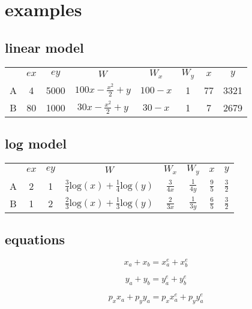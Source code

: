 \documentclass[12pt,a4paper]{article}
\author{surecalois}
\begin{document}
\section{examples}
\subsection{linear model}
\begin{center}
\begin{tabular}{cccccccc}
  & $ex$ & $ey$ & $W$ & $W_x$     & $W_y$ & $x$ & $y$ \\[10pt]
 A & 4 & 5000  & \( 100x-\frac{x^2}{2} + y \) & $ 100-x $ & 1 & 77 & 3321 \\[10pt]
 B & 80 & 1000  & \( 30x-\frac{x^2}{2} + y \) & $ 30-x $ & 1 & 7 & 2679 \\[10pt]
\end{tabular}
\end{center}
\subsection{log model}
\begin{center}
\begin{tabular}{cccccccc}
  & $ex$ & $ey$ & $W$ & $W_x$     & $W_y$ & $x$ & $y$ \\[10pt]
 A & 2 & 1  & \( \frac{3}{4}\mathrm{log}(x)+\frac{1}{4}\mathrm{log}(y) \) & $ \frac{3}{4x} $ & $\frac{1}{4y} $ & $ \frac{9}{5} $ & $ \frac{3}{2} $ \\[10pt]
 B & 1 & 2  & \( \frac{2}{3}\mathrm{log}(x)+\frac{1}{3}\mathrm{log}(y) \) & $ \frac{2}{3x} $ & $\frac{1}{3y} $ & $ \frac{6}{5} $ & $ \frac{3}{2} $ \\[10pt]
\end{tabular}
\end{center}

\subsection{equations}
\begin{equation}
x_a+x_b = x_a^e + x_b^e
\end{equation}

\begin{equation}
y_a+y_b = y_a^e + y_b^e
\end{equation}

\begin{equation}
p_xx_a+p_yy_a = p_xx_a^e+p_yy_a^e
\end{equation}
\end{document}
